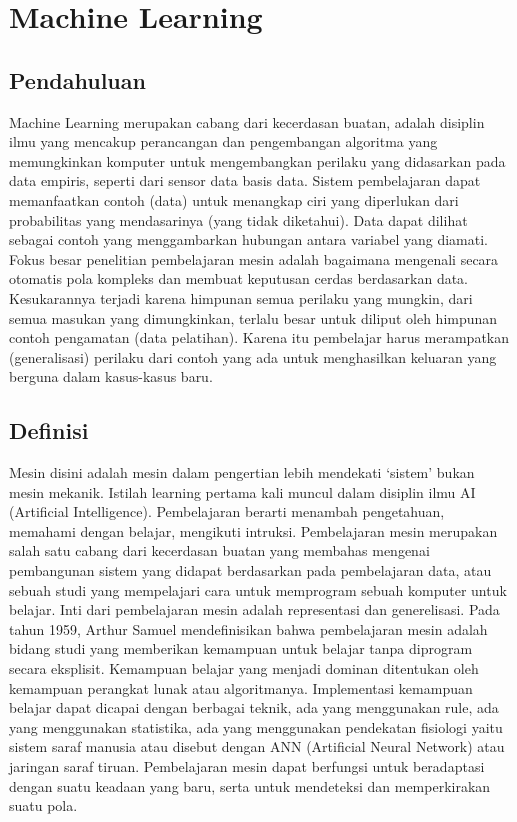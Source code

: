 \section{Machine Learning}
\subsection{Pendahuluan}
 Machine Learning merupakan cabang dari kecerdasan buatan, adalah disiplin ilmu yang mencakup perancangan dan pengembangan algoritma yang memungkinkan komputer untuk mengembangkan perilaku yang didasarkan pada data empiris, seperti dari sensor data basis data. Sistem pembelajaran dapat memanfaatkan contoh (data) untuk menangkap ciri yang diperlukan dari probabilitas yang mendasarinya (yang tidak diketahui). Data dapat dilihat sebagai contoh yang menggambarkan hubungan antara variabel yang diamati. Fokus besar penelitian pembelajaran mesin adalah bagaimana mengenali secara otomatis pola kompleks dan membuat keputusan cerdas berdasarkan data. Kesukarannya terjadi karena himpunan semua perilaku yang mungkin, dari semua masukan yang dimungkinkan, terlalu besar untuk diliput oleh himpunan contoh pengamatan (data pelatihan). Karena itu pembelajar harus merampatkan (generalisasi) perilaku dari contoh yang ada untuk menghasilkan keluaran yang berguna dalam kasus-kasus baru.

\subsection{Definisi}
 Mesin disini adalah mesin dalam pengertian lebih mendekati ‘sistem’ bukan mesin mekanik. Istilah learning pertama kali muncul dalam disiplin ilmu AI (Artificial Intelligence). Pembelajaran berarti menambah pengetahuan, memahami dengan belajar, mengikuti intruksi. Pembelajaran mesin merupakan salah satu cabang dari kecerdasan buatan yang membahas mengenai pembangunan sistem yang didapat berdasarkan pada pembelajaran data, atau sebuah studi yang mempelajari cara untuk memprogram sebuah komputer untuk belajar. Inti dari pembelajaran mesin adalah representasi dan generelisasi. Pada tahun 1959, Arthur Samuel mendefinisikan bahwa pembelajaran mesin adalah bidang studi yang memberikan kemampuan untuk belajar tanpa diprogram secara eksplisit. Kemampuan belajar yang menjadi dominan ditentukan oleh kemampuan perangkat lunak atau algoritmanya. Implementasi kemampuan belajar dapat dicapai dengan berbagai teknik, ada yang menggunakan rule, ada yang menggunakan statistika, ada yang menggunakan pendekatan fisiologi yaitu sistem saraf manusia atau disebut dengan ANN (Artificial Neural Network) atau jaringan saraf tiruan. Pembelajaran mesin dapat berfungsi untuk beradaptasi dengan suatu keadaan yang baru, serta untuk mendeteksi dan memperkirakan suatu pola.

